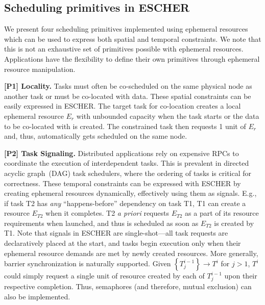 \subsection{Scheduling primitives in ESCHER}
\label{sec:sched:primitive}
We present four scheduling primitives implemented using ephemeral resources which can be used to express both spatial and temporal constraints. We note that this is not an exhaustive set of primitives possible with ephemeral resources. Applications have the flexibility to define their own primitives through ephemeral resource manipulation.

\textbf{[P1] Locality.} 
Tasks must often be co-scheduled on the same physical node as another task or must be co-located with data. These spatial constraints can be easily expressed in ESCHER. The target task for co-location creates a local ephemeral resource $E_r$ with unbounded capacity when the task starts or the data to be co-located with is created. The constrained task then requests 1 unit of $E_r$ and, thus, automatically gets scheduled on the same node.

\textbf{[P2] Task Signaling.}
Distributed applications rely on expensive RPCs to coordinate the execution of interdependent tasks. This is prevalent in directed acyclic graph~(DAG) task schedulers, where the ordering of tasks is critical for correctness. These temporal constraints can be expressed with ESCHER by creating ephemeral resources dynamically, effectively using them as signals. E.g., if task T2 has \textit{any} ``happens-before'' dependency on task T1, T1 can create a resource $E_{T2}$ when it completes. T2 \textit{a priori} requests $E_{T2}$ as a part of its resource requirements when launched, and thus is scheduled as soon as $E_{T2}$ is created by T1.  Note that signals in ESCHER are single-shot---all task requests are declaratively placed at the start, and tasks begin execution only when their ephemeral resource demands are met by newly created resources. 
More generally, barrier synchronization is naturally supported. Given $\left\{ T^{i-1}_j \right\} \rightarrow T^i$ for $j>1$, $T^i$ could simply request a single unit of resource created by each of $T^{i-1}_j$ upon their respective completion. Thus, semaphores (and therefore, mutual exclusion) can also be implemented. %

